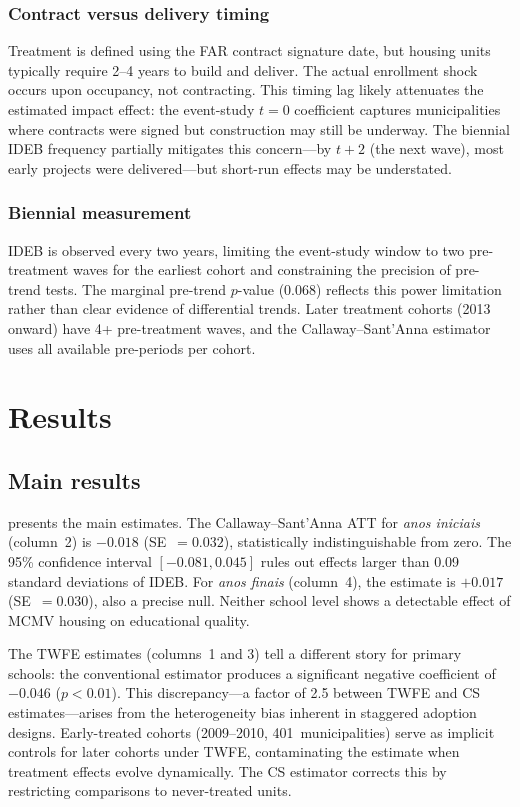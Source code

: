 \documentclass[12pt]{article}
\begin{document}
\subsubsection*{Contract versus delivery timing} Treatment is defined using the FAR contract signature date, but housing units typically require 2--4 years to build and deliver. The actual enrollment shock occurs upon occupancy, not contracting. This timing lag likely attenuates the estimated impact effect: the event-study $t=0$ coefficient captures municipalities where contracts were signed but construction may still be underway. The biennial IDEB frequency partially mitigates this concern---by $t+2$ (the next wave), most early projects were delivered---but short-run effects may be understated.

\subsubsection*{Biennial measurement} IDEB is observed every two years, limiting the event-study window to two pre-treatment waves for the earliest cohort and constraining the precision of pre-trend tests. The marginal pre-trend $p$-value (0.068) reflects this power limitation rather than clear evidence of differential trends. Later treatment cohorts (2013 onward) have 4+ pre-treatment waves, and the Callaway--Sant'Anna estimator uses all available pre-periods per cohort.


\section{Results}

\subsection{Main results}



 presents the main estimates. The Callaway--Sant'Anna ATT for \textit{anos iniciais} (column~2) is $-0.018$ (SE~$= 0.032$), statistically indistinguishable from zero. The 95\% confidence interval $[-0.081, 0.045]$ rules out effects larger than 0.09 standard deviations of IDEB. For \textit{anos finais} (column~4), the estimate is $+0.017$ (SE~$= 0.030$), also a precise null. Neither school level shows a detectable effect of MCMV housing on educational quality.

The TWFE estimates (columns~1 and 3) tell a different story for primary schools: the conventional estimator produces a significant negative coefficient of $-0.046$ ($p < 0.01$). This discrepancy---a factor of 2.5 between TWFE and CS estimates---arises from the heterogeneity bias inherent in staggered adoption designs. Early-treated cohorts (2009--2010, 401~municipalities) serve as implicit controls for later cohorts under TWFE, contaminating the estimate when treatment effects evolve dynamically. The CS estimator corrects this by restricting comparisons to never-treated units.
\end{document}
